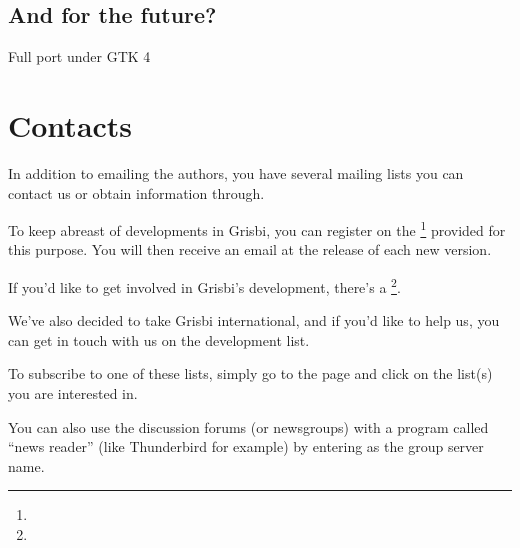 \subsection{And for the future?}

Full port under \gls{GTK} 4

\section{Contacts\label{introduction-contacts}}

In addition to emailing the authors, you have several mailing lists you can contact us or obtain information through.

To keep abreast of developments in Grisbi, you can register on the \footnote{\urlListInfoEmail{}} provided for this purpose.  You will then receive an email at the release of each new version.

If you'd like to get involved in Grisbi's development, there's a \footnote{\urlListDevelEmail{}}.


We've also decided to take Grisbi international, and if you'd like to help us, you can get in touch with us on the development list.



To subscribe to one of these lists, simply go to the \urlListDiffGrisbi{} page and click on the list(s) you are interested in.

You can also use the discussion forums (or newsgroups) with a program called ``news reader'' (like Thunderbird for example) by entering  as the group server name.

